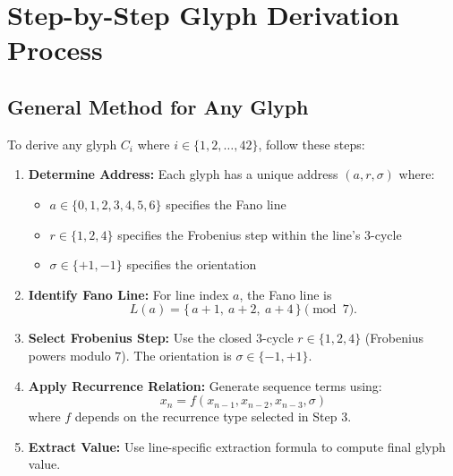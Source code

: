 \documentclass[pdflatex,sn-mathphys-num]{sn-jnl}
\theoremstyle{thmstyleone}
\theoremstyle{thmstyletwo}
\theoremstyle{thmstylethree}
\begin{document}
\begin{longtable}{@{}r c c c c l l@{}}
\bottomrule
\end{longtable}

\section{Step-by-Step Glyph Derivation Process}

\subsection{General Method for Any Glyph}

To derive any glyph $C_i$ where $i \in \{1, 2, \ldots, 42\}$, follow these steps:

\begin{enumerate}
    \item \textbf{Determine Address:} Each glyph has a unique address $(a, r, \sigma)$ where:
    \begin{itemize}
        \item $a \in \{0, 1, 2, 3, 4, 5, 6\}$ specifies the Fano line
        \item $r \in \{1,2,4\}$ specifies the Frobenius step within the line’s 3-cycle
        \item $\sigma \in \{+1, -1\}$ specifies the orientation
    \end{itemize}
    
     \item \textbf{Identify Fano Line:} For line index $a$, the Fano line is
     \begin{equation}
            L(a) = \{\,a+1,\ a+2,\ a+4\,\} \pmod{7}.
     \end{equation}

     \item \textbf{Select Frobenius Step:} Use the closed 3-cycle $r \in \{1,2,4\}$ (Frobenius powers modulo $7$). The orientation is $\sigma \in \{-1,+1\}$.

    
    \item \textbf{Apply Recurrence Relation:} Generate sequence terms using:
    \begin{equation}
    x_n = f(x_{n-1}, x_{n-2}, x_{n-3}, \sigma)
    \end{equation}
    where $f$ depends on the recurrence type selected in Step 3.
    
    \item \textbf{Extract Value:} Use line-specific extraction formula to compute final glyph value.
\end{enumerate}
\end{document}
